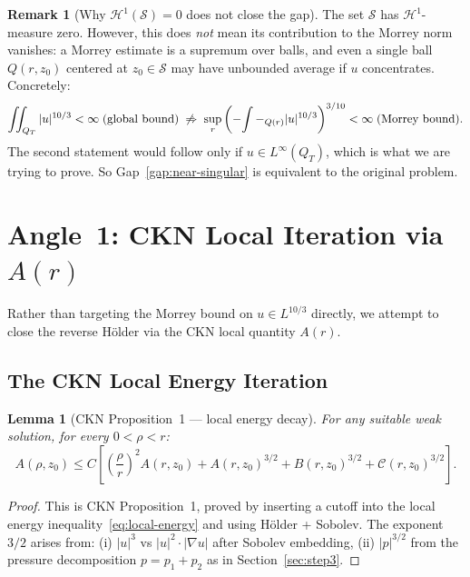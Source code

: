 \documentclass[11pt]{article}
\newtheorem{lemma}[theorem]{Lemma}
\theoremstyle{definition}
\newtheorem{remark}[theorem]{Remark}
\theoremstyle{remark}
\newcommand{\grad}{\nabla}
\newcommand{\Xint}{\mathop{\mathchoice{\vcenter{\hbox{$\displaystyle-$}}}%
  {\vcenter{\hbox{$\textstyle-$}}}%
  {\vcenter{\hbox{$\scriptstyle-$}}}%
  {\vcenter{\hbox{$\scriptscriptstyle-$}}}}\!\int}
\begin{document}
\begin{remark}[Why $\mathcal{H}^1(\mathcal{S})=0$ does not close the gap]\label{rem:H1-insufficient}
  The set $\mathcal{S}$ has $\mathcal{H}^1$-measure zero.  However, this
  does \emph{not} mean its contribution to the Morrey norm vanishes:
  a Morrey estimate is a supremum over balls, and even a single ball $Q(r,z_0)$
  centered at $z_0\in\mathcal{S}$ may have unbounded average if $u$ concentrates.
  Concretely:
  \[
    \iint_{Q_T}|u|^{10/3} < \infty\;\text{(global bound)}
    \;\not\Rightarrow\;
    \sup_r\left(\Xint-_{Q(r)}|u|^{10/3}\right)^{3/10} < \infty\;\text{(Morrey bound)}.
  \]
  The second statement would follow only if $u\in L^\infty(Q_T)$,
  which is what we are trying to prove.  So Gap~\ref{gap:near-singular}
  is equivalent to the original problem.
\end{remark}

\section{Angle~1: CKN Local Iteration via $A(r)$}
\label{sec:Ar-iteration}

Rather than targeting the Morrey bound on $u\in L^{10/3}$ directly,
we attempt to close the reverse H\"older via the CKN local quantity $A(r)$.

\subsection{The CKN Local Energy Iteration}

\begin{lemma}[CKN Proposition~1 --- local energy decay]\label{lem:CKN-prop1}
  For any suitable weak solution, for every $0 < \rho < r$:
  \begin{equation}\label{eq:CKN-iteration}
    A(\rho,z_0)
    \leq C\left[\left(\frac{\rho}{r}\right)^2 A(r,z_0)
      + A(r,z_0)^{3/2}
      + B(r,z_0)^{3/2}
      + \mathcal{C}(r,z_0)^{3/2}\right].
  \end{equation}
\end{lemma}

\begin{proof}
  This is CKN Proposition~1, proved by inserting a cutoff into the local
  energy inequality~\eqref{eq:local-energy} and using H\"older + Sobolev.
  The exponent $3/2$ arises from: (i) $|u|^3$ vs $|u|^2\cdot|\grad u|$
  after Sobolev embedding, (ii) $|p|^{3/2}$ from the pressure decomposition
  $p=p_1+p_2$ as in Section~\ref{sec:step3}.
\end{proof}
\end{document}
